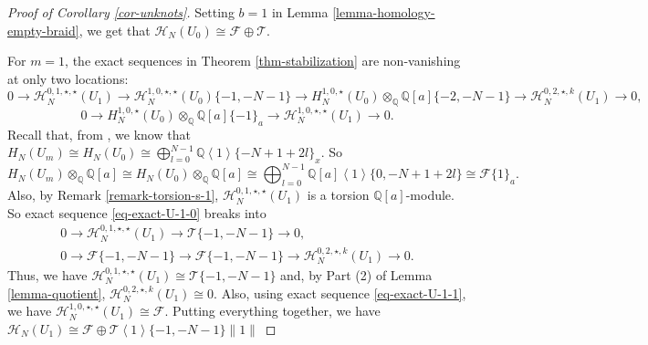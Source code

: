 \documentclass{amsart}
\theoremstyle{plain}
\theoremstyle{definition}
\theoremstyle{remark}
\numberwithin{equation}{section}
\begin{document}
\begin{proof}[Proof of Corollary \ref{cor-unknots}]
Setting $b=1$ in Lemma \ref{lemma-homology-empty-braid}, we get that ${\mathcal{H}}_N(U_0) \cong \mathcal{F} \oplus \mathcal{T}$. 

For $m=1$, the exact sequences in Theorem \ref{thm-stabilization} are non-vanishing at only two locations:
\begin{equation}
\label{eq-exact-U-1-0}  0 \rightarrow {\mathcal{H}}_N^{0,1,\star,\star}(U_1) \rightarrow {\mathcal{H}}_N^{1,0,\star,\star}(U_0)\{-1, -N-1\} \rightarrow H_N^{1,0,\star}(U_0)\otimes_{\mathbb{Q}} {\mathbb{Q}}[a]\{-2,-N-1\} \rightarrow {\mathcal{H}}_N^{0,2,\star,k}(U_1) \rightarrow 0,
\end{equation}
\begin{equation}\label{eq-exact-U-1-1} 
0 \rightarrow H_N^{1,0,\star}(U_0)\otimes_{\mathbb{Q}} {\mathbb{Q}}[a]\{-1\}_a \rightarrow {\mathcal{H}}_N^{1,0,\star,\star}(U_1) \rightarrow 0. 
\end{equation}
Recall that, from \cite{KR1}, we know that $H_N(U_m)\cong H_N(U_0)\cong \bigoplus_{l=0}^{N-1}{\mathbb{Q}}\left\langle 1\right\rangle \{-N+1+2l\}_x$. So 
\begin{equation}\label{eq-unknot-KR}
H_N(U_m)\otimes_{\mathbb{Q}} {\mathbb{Q}}[a] \cong H_N(U_0)\otimes_{\mathbb{Q}} {\mathbb{Q}}[a] \cong \bigoplus_{l=0}^{N-1}{\mathbb{Q}}[a]\left\langle 1\right\rangle \{0, -N+1+2l\} \cong \mathcal{F} \{1\}_a. 
\end{equation}
Also, by Remark \ref{remark-torsion-s-1}, $ {\mathcal{H}}_N^{0,1,\star,\star}(U_1)$ is a torsion ${\mathbb{Q}}[a]$-module. So exact sequence \eqref{eq-exact-U-1-0} breaks into 
\begin{eqnarray}
\label{eq-exact-U-1-2} & 0 \rightarrow {\mathcal{H}}_N^{0,1,\star,\star}(U_1) \rightarrow \mathcal{T}\{-1, -N-1\} \rightarrow 0, & \\
\label{eq-exact-U-1-3} & 0 \rightarrow \mathcal{F}\{-1, -N-1\} \rightarrow \mathcal{F}\{-1,-N-1\} \rightarrow {\mathcal{H}}_N^{0,2,\star,k}(U_1) \rightarrow 0. &
\end{eqnarray}
Thus, we have ${\mathcal{H}}_N^{0,1,\star,\star}(U_1) \cong \mathcal{T}\{-1, -N-1\}$ and, by Part (2) of Lemma \ref{lemma-quotient}, ${\mathcal{H}}_N^{0,2,\star,k}(U_1) \cong 0$. Also, using exact sequence \eqref{eq-exact-U-1-1}, we have ${\mathcal{H}}_N^{1,0,\star,\star}(U_1) \cong \mathcal{F}$. Putting everything together, we have ${\mathcal{H}}_N(U_1) \cong \mathcal{F} \oplus \mathcal{T} \left\langle 1 \right\rangle \{-1, -N-1\}\|1\|$


\end{proof}
\end{document}
